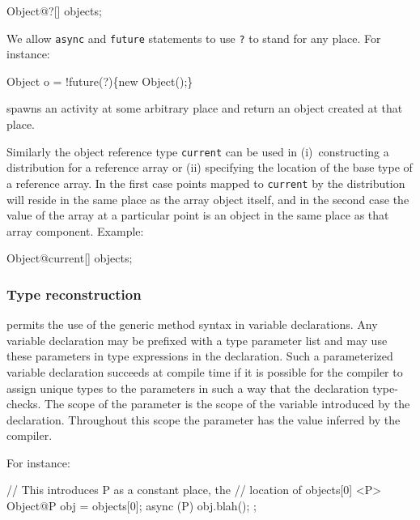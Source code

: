 \begin{x10}
    Object@?[] objects;
\end{x10}

We allow {\tt async} and {\tt future} statements to use {\tt ?} to
stand for any place. For instance:

\begin{x10}
     Object o = !future(?)\{new Object();\}
\end{x10}

\noindent spawns an activity at some arbitrary place and return an object created at that place.

Similarly the object reference type {\tt current} can be used in
(i)~constructing a distribution for a reference array or (ii)
specifying the location of the base type of a reference array. In the
first case points mapped to {\tt current} by the distribution will
reside in the same place as the array object itself, and in the second
case the value of the array at a particular point is an object in the
same place as that array component. Example:
\begin{x10}
    Object@current[] objects;
\end{x10}

\subsubsection{Type reconstruction}

{}\Xten{} permits the use of the generic method syntax in variable
declarations. Any variable declaration may be prefixed with a type
parameter list and may use these parameters in type expressions in the
declaration. Such a parameterized variable declaration succeeds at
compile time if it is possible for the compiler to assign unique types
to the parameters in such a way that the declaration type-checks.  The
scope of the parameter is the scope of the variable introduced by the
declaration. Throughout this scope the parameter has the value
inferred by the compiler.

For instance:
\begin{x10}
  // This introduces P as a constant place, the
  // location of objects[0]
 <P> Object@P obj = objects[0];
 async (P) { obj.blah(); };
\end{x10}

